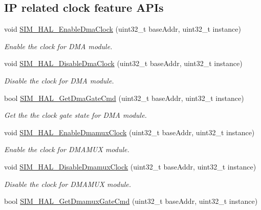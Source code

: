 \subsection*{IP related clock feature A\+P\+Is}
\begin{DoxyCompactItemize}
\item 
void \hyperlink{group__sim__hal_ga5bffb0833f52f8270cefb7f29d5732b8}{S\+I\+M\+\_\+\+H\+A\+L\+\_\+\+Enable\+Dma\+Clock} (uint32\+\_\+t base\+Addr, uint32\+\_\+t instance)
\begin{DoxyCompactList}\small\item\em Enable the clock for D\+MA module. \end{DoxyCompactList}\item 
void \hyperlink{group__sim__hal_ga6c103d4ced60300ded30c327ee1d65e2}{S\+I\+M\+\_\+\+H\+A\+L\+\_\+\+Disable\+Dma\+Clock} (uint32\+\_\+t base\+Addr, uint32\+\_\+t instance)
\begin{DoxyCompactList}\small\item\em Disable the clock for D\+MA module. \end{DoxyCompactList}\item 
bool \hyperlink{group__sim__hal_ga8842bfd07443e8221212d511a5ab5ee6}{S\+I\+M\+\_\+\+H\+A\+L\+\_\+\+Get\+Dma\+Gate\+Cmd} (uint32\+\_\+t base\+Addr, uint32\+\_\+t instance)
\begin{DoxyCompactList}\small\item\em Get the the clock gate state for D\+MA module. \end{DoxyCompactList}\item 
void \hyperlink{group__sim__hal_ga30f1820c74557353473201264dce250f}{S\+I\+M\+\_\+\+H\+A\+L\+\_\+\+Enable\+Dmamux\+Clock} (uint32\+\_\+t base\+Addr, uint32\+\_\+t instance)
\begin{DoxyCompactList}\small\item\em Enable the clock for D\+M\+A\+M\+UX module. \end{DoxyCompactList}\item 
void \hyperlink{group__sim__hal_ga190381de046fca5af7bc78c53bd5fbe3}{S\+I\+M\+\_\+\+H\+A\+L\+\_\+\+Disable\+Dmamux\+Clock} (uint32\+\_\+t base\+Addr, uint32\+\_\+t instance)
\begin{DoxyCompactList}\small\item\em Disable the clock for D\+M\+A\+M\+UX module. \end{DoxyCompactList}\item 
bool \hyperlink{group__sim__hal_gad58a586e7eb4ba6ec75f59a51b727231}{S\+I\+M\+\_\+\+H\+A\+L\+\_\+\+Get\+Dmamux\+Gate\+Cmd} (uint32\+\_\+t base\+Addr, uint32\+\_\+t instance)

\end{DoxyCompactItemize}
